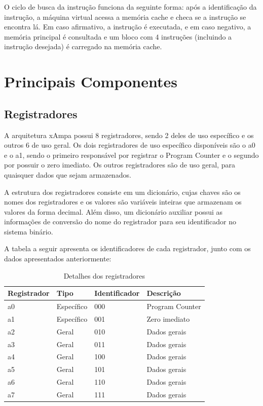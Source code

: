 \documentclass[
	12pt,				%
	oneside,			%
	a4paper,			%
	english,			%
	french,				%
	spanish,			%
	brazil				%
	]{abntex2}
\begin{document}
O ciclo de busca da instrução funciona da seguinte forma: após a identificação da instrução, a máquina virtual acessa a memória cache e checa se a instrução se encontra lá. Em caso afirmativo, a instrução é executada, e em caso negativo, a memória principal é consultada e um bloco com 4 instruções (incluindo a instrução desejada) é carregado na memória cache.

\chapter{Principais Componentes}

\section{Registradores}

A arquitetura xAmpa possui 8 registradores, sendo 2 deles de uso específico e os outros 6 de uso geral. Os dois registradores de uso específico disponíveis são o a0 e o a1, sendo o primeiro responsável por registrar o Program Counter
e o segundo por possuir o zero imediato. Os outros registradores são de uso geral, para quaisquer dados que sejam armazenados. 

A estrutura dos registradores consiste em um dicionário, cujas chaves são os nomes dos registradores e os valores são variáveis inteiras que armazenam os valores da forma decimal. Além disso, um dicionário auxiliar possui as informações de conversão do nome do registrador para seu identificador no sistema binário.

A tabela a seguir apresenta os identificadores de cada registrador, junto com os dados apresentados anteriormente:\\

\begin{table}[htb]
\center
\footnotesize
\begin{tabular}{|p{3cm}|p{3cm}|p{3cm}|p{3cm}|}
  \hline
   \textbf{Registrador} & \textbf{Tipo} & \textbf{Identificador} & \textbf{Descrição} \\
    \hline
    a0 & Específico & 000 & Program Counter\\
    \hline
    a1 & Específico & 001 & Zero imediato\\
    \hline
    a2 & Geral & 010 & Dados gerais\\
    \hline
    a3 & Geral & 011 & Dados gerais\\
    \hline
    a4 & Geral & 100 & Dados gerais\\
    \hline
    a5 & Geral & 101 & Dados gerais\\
    \hline
    a6 & Geral & 110 & Dados gerais\\
    \hline
    a7 & Geral & 111 & Dados gerais\\
    \hline
\end{tabular}
\caption{Detalhes dos registradores}
\label{table3:sample}
\end{table}
\end{document}
